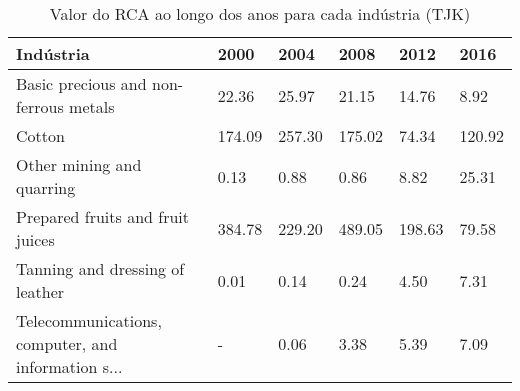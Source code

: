 \begin{table}
\centering
\caption{Valor do RCA ao longo dos anos para cada indústria (TJK)}
\label{tab:ex3-tempo-TJK}
\begin{tabular}{p{6cm}p{1.5cm}p{1.5cm}p{1.5cm}p{1.5cm}p{1.5cm}}
\toprule
                                         Indústria &   2000 &   2004 &   2008 &   2012 &   2016 \\
\midrule
             Basic precious and non-ferrous metals &  22.36 &  25.97 &  21.15 &  14.76 &   8.92 \\
                                            Cotton & 174.09 & 257.30 & 175.02 &  74.34 & 120.92 \\
                         Other mining and quarring &   0.13 &   0.88 &   0.86 &   8.82 &  25.31 \\
                  Prepared fruits and fruit juices & 384.78 & 229.20 & 489.05 & 198.63 &  79.58 \\
                   Tanning and dressing of leather &   0.01 &   0.14 &   0.24 &   4.50 &   7.31 \\
Telecommunications, computer, and information s... &      - &   0.06 &   3.38 &   5.39 &   7.09 \\
\bottomrule
\end{tabular}
\end{table}
